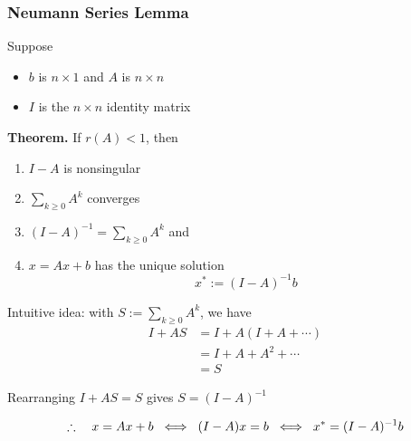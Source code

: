 \begin{frame}
    \frametitle{Neumann Series Lemma}

    Suppose 
    \begin{itemize}
        \item $b$ is $n \times 1$ and $A$ is $n \times n$ 
        \item $I$ is the $n \times n$ identity matrix
    \end{itemize}

    \vspace{0.5em}

    \vspace{0.5em}
    {\bf Theorem.} 
    If $r(A) < 1$, then
    \begin{enumerate}
        \item $I - A$ is nonsingular 
        \vspace{0.5em}
        \item $\sum_{k \geq 0} A^k$ converges 
        \vspace{0.5em}
        \item $(I - A)^{-1} = \sum_{k \geq 0} A^k$ and
        \vspace{0.5em}
        \item $x = A x + b$ has the unique solution 
            \begin{equation*}
                x^* := (I - A)^{-1} b 
            \end{equation*}
    \end{enumerate}

    
\end{frame}

\begin{frame}
    
    Intuitive idea: with $S := \sum_{k \geq 0} A^k$, we have
    \begin{align*}
        I + AS 
        & = I + A (I + A + \cdots)
        \\
        & = I + A + A^2 + \cdots 
        \\
        & = S
    \end{align*}

    Rearranging $I + AS = S$ gives $S = (I - A)^{-1}$
            \vspace{0.5em}
            \vspace{0.5em}

    \begin{equation*}
        \therefore \quad
        x = Ax + b
        \; \iff \; 
        (I - A)x = b
        \; \iff \; 
        x^* = (I-A)^{-1} b
    \end{equation*}


\end{frame}


